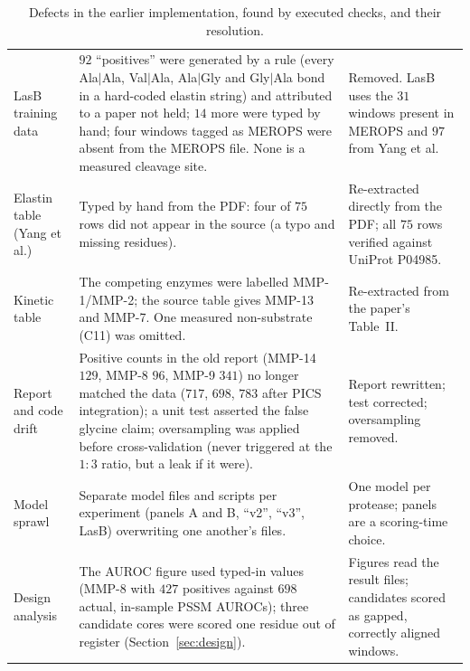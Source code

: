 \begin{table}[!htbp]
\begin{tabular}{@{}p{}p{}p{}@{}}
LasB training data & $92$ ``positives'' were generated by a rule (every Ala$|$Ala, Val$|$Ala, Ala$|$Gly and Gly$|$Ala bond in a hard-coded elastin string) and attributed to a paper not held; $14$ more were typed by hand; four windows tagged as MEROPS were absent from the MEROPS file. None is a measured cleavage site. & Removed. LasB uses the $31$ windows present in MEROPS and $97$ from Yang et al. \\
Elastin table (Yang et al.) & Typed by hand from the PDF: four of $75$ rows did not appear in the source (a typo and missing residues). & Re-extracted directly from the PDF; all $75$ rows verified against UniProt P04985. \\
Kinetic table & The competing enzymes were labelled MMP-1/MMP-2; the source table gives MMP-13 and MMP-7. One measured non-substrate (C11) was omitted. & Re-extracted from the paper's Table~II. \\
Report and code drift & Positive counts in the old report (MMP-14 $129$, MMP-8 $96$, MMP-9 $341$) no longer matched the data ($717$, $698$, $783$ after PICS integration); a unit test asserted the false glycine claim; oversampling was applied before cross-validation (never triggered at the $1{:}3$ ratio, but a leak if it were). & Report rewritten; test corrected; oversampling removed. \\
Model sprawl & Separate model files and scripts per experiment (panels A and B, ``v2'', ``v3'', LasB) overwriting one another's files. & One model per protease; panels are a scoring-time choice. \\
Design analysis & The AUROC figure used typed-in values (MMP-8 with $427$ positives against $698$ actual, in-sample PSSM AUROCs); three candidate cores were scored one residue out of register (Section~\ref{sec:design}). & Figures read the result files; candidates scored as gapped, correctly aligned windows. \\\bottomrule
\end{tabular}
\caption{Defects in the earlier implementation, found by executed checks, and their resolution.}
\end{table}
